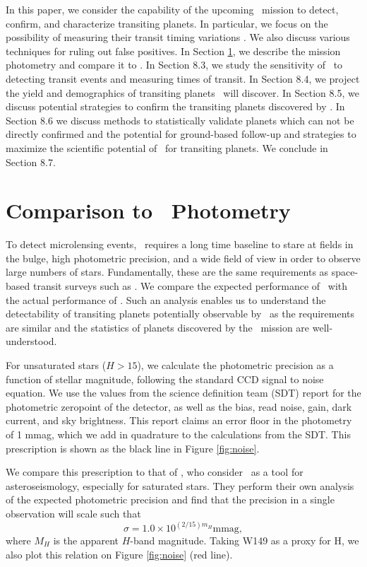 In this paper, we consider the capability of the upcoming \WF\ mission
to detect, confirm, and characterize transiting planets. In
particular, we focus on the possibility of measuring their transit timing variations \citep[TTVs,][]{Agol05, Holman05,LithwickWu12}. We
also discuss various techniques for ruling out false positives. In
Section \ref{sec:kepler}, we describe the mission photometry and compare it to \kep. 
In Section 8.3, we study
the sensitivity of \WF\ to detecting transit events and measuring
times of transit. 
In Section 8.4, we project the yield and demographics of transiting planets \WF\ will 
discover. In Section 8.5, we discuss potential strategies to
confirm the transiting planets discovered by \WF.  In Section 8.6 we discuss 
methods to statistically validate planets which can not be directly confirmed and
the potential for ground-based follow-up and strategies to maximize the
scientific potential of \WF\ for transiting planets. 
We conclude in Section 8.7.

\section{Comparison to \kep\ Photometry}
\label{sec:kepler}

To detect microlensing events, \WF\ requires a long time baseline to stare at fields
in the bulge, high photometric precision, and a wide field of view in order to observe
large numbers of stars.
Fundamentally, these are the same requirements as space-based transit surveys such as \kep.
We compare the expected performance of \WF\ with the actual
performance of \kep.
Such an analysis enables us to understand the detectability of transiting planets
potentially
observable by \WF\ 
as the requirements are similar and the statistics of planets discovered by the \kep\ 
mission are well-understood.


For unsaturated stars ($H > 15$), we calculate the photometric precision as a function of stellar magnitude, following
the standard CCD signal to noise equation. We use the values from the science definition team (SDT) report \citep{Spergel15}
for the photometric zeropoint of the
detector, as well as the bias, read noise, gain, dark current, and sky brightness. 
This report claims an error floor in the photometry of 1 mmag, which we add in quadrature to
the calculations from the SDT. This prescription is shown as the black line in Figure \ref{fig:noise}.


We compare this prescription to that of \citet{Gould15}, who
consider \WF\ as a tool for asteroseismology, especially
for saturated stars.
They perform their own analysis of the expected photometric precision and find that the precision in a single observation will scale such that
\begin{equation}
\sigma = 1.0 \times 10^{(2/15)m_H} \textrm{mmag},
\end{equation}
where $M_H$ is the apparent $H$-band magnitude. 
Taking W149 as a proxy for H, we also plot this relation on Figure \ref{fig:noise} (red line).


